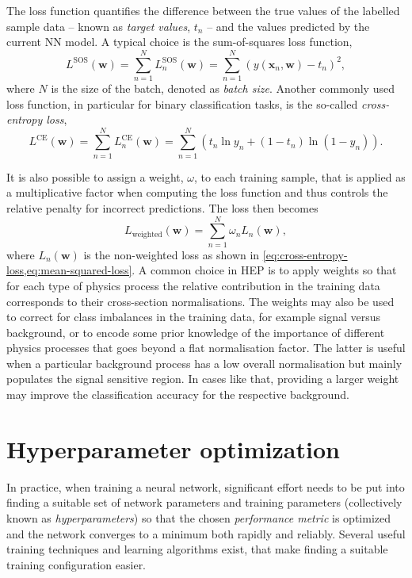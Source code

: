 The loss function quantifies the difference between the true values of the labelled sample data -- known as \emph{target values}, $t_n$ -- and the values predicted by the current NN model. A typical choice is the sum-of-squares loss function,
\begin{equation}
    \label{eq:mean-squared-loss}
   L^{\text{SOS}}(\pmb{w}) = \sum _{n=1}^{N}L_n^{\text{SOS}}(\pmb{w})= \sum _{n=1}^{N}\left( y(\pmb{x}_n, \pmb{w})-t_n \right)^{2},
\end{equation}
where $N$ is the size of the batch, denoted as \emph{batch size}. 
Another commonly used loss function, in particular for binary classification tasks, is the so-called \emph{cross-entropy loss},
\begin{equation}
    \label{eq:cross-entropy-loss}
    L^{\text{CE}}(\pmb{w}) = \sum _{n=1}^{N}L_n^{\text{CE}}(\pmb{w}) = \sum _{n=1}^{N}\left( t_n \ln y_n + ( 1 - t_n) \ln (1 - y_n) \right).
\end{equation}

It is also possible to assign a weight, $\omega$, to each training sample, that is applied as a multiplicative factor when computing the loss function and thus controls the relative penalty for incorrect predictions. The loss then becomes
\begin{equation}
    L_{\text{weighted}}(\pmb{w}) = \sum _{n=1}^{N} \omega_n L_n(\pmb{w}), 
\end{equation}
where $L_n(\pmb{w})$ is the non-weighted loss as shown in \cref{eq:cross-entropy-loss,eq:mean-squared-loss}. 
A common choice in HEP is to apply weights so that for each type of physics process the relative contribution in the training data corresponds to their cross-section normalisations.
The weights may also be used to correct for class imbalances in the training data, for example signal versus background, or to encode some prior knowledge of the importance of different physics processes that goes beyond a flat normalisation factor. The latter is useful when a particular background process has a low overall normalisation but mainly populates the signal sensitive region. In cases like that, providing a larger weight may improve the classification accuracy for the respective background. 


\section{Hyperparameter optimization} 
In practice, when training a neural network, significant effort needs to be put into finding a suitable set of network parameters and training parameters (collectively known as \emph{hyperparameters}) so that the chosen \emph{performance metric} is optimized and the network converges to a minimum both rapidly and reliably. 
Several useful training techniques and learning algorithms exist, that make finding a suitable training configuration easier.

